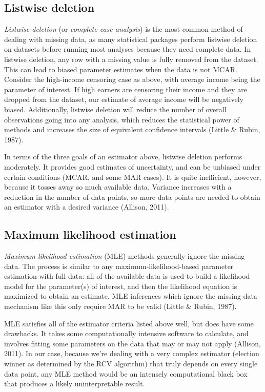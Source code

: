\documentclass[12pt,twoside]{reedthesis}
\begin{document}
\hypertarget{listwise-deletion}{%
\subsection{Listwise deletion}\label{listwise-deletion}}

\emph{Listwise deletion} (or \emph{complete-case analysis}) is the most common method of dealing with missing data, as many statistical packages perform listwise deletion on datasets before running most analyses because they need complete data. In listwise deletion, any row with a missing value is fully removed from the dataset. This can lead to biased parameter estimates when the data is not MCAR. Consider the high-income censoring case as above, with average income being the parameter of interest. If high earners are censoring their income and they are dropped from the dataset, our estimate of average income will be negatively biased. Additionally, listwise deletion will reduce the number of overall observations going into any analysis, which reduces the statistical power of methods and increases the size of equivalent confidence intervals (Little \& Rubin, 1987).

In terms of the three goals of an estimator above, listwise deletion performs moderately. It provides good estimates of uncertainty, and can be unbiased under certain conditions (MCAR, and some MAR cases). It is quite inefficient, however, because it tosses away so much available data. Variance increases with a reduction in the number of data points, so more data points are needed to obtain an estimator with a desired variance (Allison, 2011).

\hypertarget{maximum-likelihood-estimation}{%
\subsection{Maximum likelihood estimation}\label{maximum-likelihood-estimation}}

\emph{Maximum likelihood estimation} (MLE) methods generally ignore the missing data. The process is similar to any maximum-likelihood-based parameter estimation with full data: all of the available data is used to build a likelihood model for the parameter(s) of interest, and then the likelihood equation is maximized to obtain an estimate. MLE inferences which ignore the missing-data mechanism like this only require MAR to be valid (Little \& Rubin, 1987).

MLE satisfies all of the estimator criteria listed above well, but does have some drawbacks. It takes some computationally intensive software to calculate, and involves fitting some parameters on the data that may or may not apply (Allison, 2011). In our case, because we're dealing with a very complex estimator (election winner as determined by the RCV algorithm) that truly depends on every single data point, any MLE method would be an intensely computational black box that produces a likely uninterpretable result.
\end{document}
